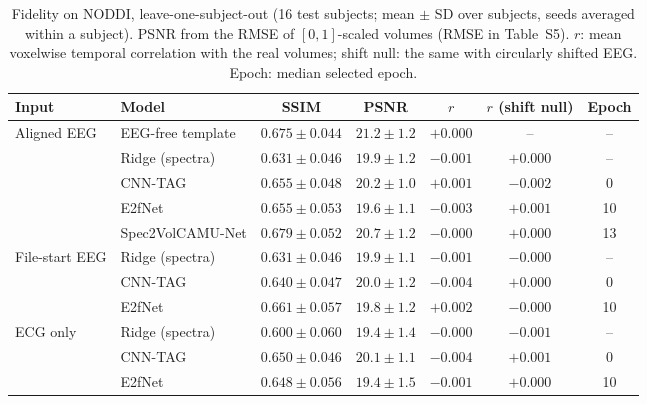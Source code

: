 \documentclass[10pt]{article}
\begin{document}
\begin{table}[h]
    \centering
    \caption{Fidelity on NODDI, leave-one-subject-out (16 test subjects; mean $\pm$ SD over subjects, seeds averaged within a subject). PSNR from the RMSE of $[0,1]$-scaled volumes (RMSE in Table~S5). $r$: mean voxelwise temporal correlation with the real volumes; shift null: the same with circularly shifted EEG. Epoch: median selected epoch.}
    \label{tab:s_fidelity}
    \scriptsize\setlength{\tabcolsep}{2.5pt}
    \begin{tabular}{@{}l l c c c c c@{}}
        \hline
        Input & Model & SSIM & PSNR & $r$ & $r$ (shift null) & Epoch \\
        \hline
        Aligned EEG & EEG-free template & $0.675\pm0.044$ & $21.2\pm1.2$ & $+0.000$ & -- & -- \\
         & Ridge (spectra) & $0.631\pm0.046$ & $19.9\pm1.2$ & $-0.001$ & $+0.000$ & -- \\
         & CNN-TAG & $0.655\pm0.048$ & $20.2\pm1.0$ & $+0.001$ & $-0.002$ & 0 \\
         & E2fNet & $0.655\pm0.053$ & $19.6\pm1.1$ & $-0.003$ & $+0.001$ & 10 \\
         & Spec2VolCAMU-Net & $0.679\pm0.052$ & $20.7\pm1.2$ & $-0.000$ & $+0.000$ & 13 \\
        File-start EEG & Ridge (spectra) & $0.631\pm0.046$ & $19.9\pm1.1$ & $-0.001$ & $-0.000$ & -- \\
         & CNN-TAG & $0.640\pm0.047$ & $20.0\pm1.2$ & $-0.004$ & $+0.000$ & 0 \\
         & E2fNet & $0.661\pm0.057$ & $19.8\pm1.2$ & $+0.002$ & $-0.000$ & 10 \\
        ECG only & Ridge (spectra) & $0.600\pm0.060$ & $19.4\pm1.4$ & $-0.000$ & $-0.001$ & -- \\
         & CNN-TAG & $0.650\pm0.046$ & $20.1\pm1.1$ & $-0.004$ & $+0.001$ & 0 \\
         & E2fNet & $0.648\pm0.056$ & $19.4\pm1.5$ & $-0.001$ & $+0.000$ & 10 \\
        \hline
    \end{tabular}
\end{table}
\end{document}

